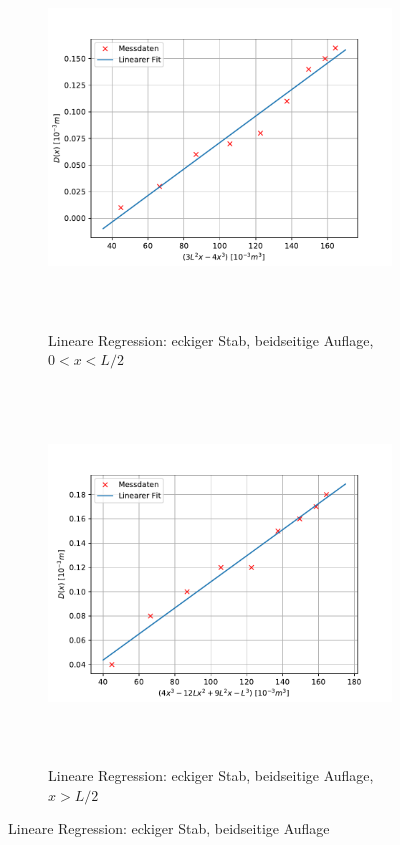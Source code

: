 \begin{figure}[H]
  \begin{subfigure}{\textwidth}
  \centering
  \includegraphics[height=10cm]{content/plots/eckb1.pdf}
  \caption{Lineare Regression: eckiger Stab, beidseitige Auflage, $0<x<L/2$}
  \label{fig:LinRegeckb1}
  \end{subfigure}
  \begin{subfigure}{\textwidth}
  \centering
  \includegraphics[height=10cm]{content/plots/eckb2.pdf}
  \caption{Lineare Regression: eckiger Stab, beidseitige Auflage, $x>L/2$}
  \label{fig:LinRegeckb2}
  \end{subfigure}
  \caption{Lineare Regression: eckiger Stab, beidseitige Auflage}
  \label{fig:LinRegeckb}
\end{figure}

